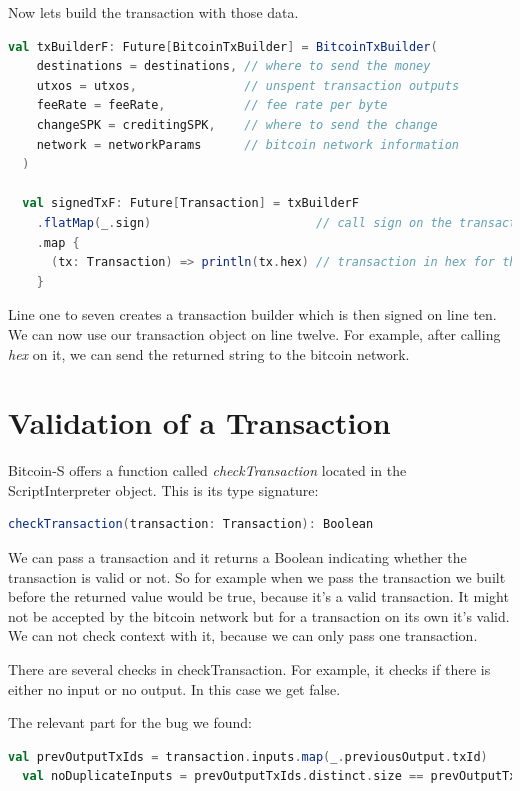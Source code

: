 Now lets build the transaction with those data.
\begin{lstlisting}[language=scala]
  val txBuilderF: Future[BitcoinTxBuilder] = BitcoinTxBuilder(
    destinations = destinations, // where to send the money
    utxos = utxos,               // unspent transaction outputs
    feeRate = feeRate,           // fee rate per byte
    changeSPK = creditingSPK,    // where to send the change
    network = networkParams      // bitcoin network information
  )

  val signedTxF: Future[Transaction] = txBuilderF
    .flatMap(_.sign)                       // call sign on the transaction builder
    .map {
      (tx: Transaction) => println(tx.hex) // transaction in hex for the bitcoin network
    }
\end{lstlisting}


Line one to seven creates a transaction builder which is then signed on line ten.
We can now use our transaction object on line twelve.
For example, after calling \emph{hex} on it, we can send the returned string to the bitcoin network.


\section{Validation of a Transaction}

Bitcoin-S offers a function called \emph{checkTransaction} located in the ScriptInterpreter object.
This is its type signature:
\begin{lstlisting}[language=scala]
  checkTransaction(transaction: Transaction): Boolean
\end{lstlisting}


We can pass a transaction and it returns a Boolean indicating whether the transaction is valid or not.
So for example when we pass the transaction we built before the returned value would be true, because it's a valid transaction.
It might not be accepted by the bitcoin network but for a transaction on its own it's valid.
We can not check context with it, because we can only pass one transaction.

There are several checks in checkTransaction.
For example, it checks if there is either no input or no output.
In this case we get false.

The relevant part for the bug we found:
\begin{lstlisting}[language=scala]
  val prevOutputTxIds = transaction.inputs.map(_.previousOutput.txId)
  val noDuplicateInputs = prevOutputTxIds.distinct.size == prevOutputTxIds.size
\end{lstlisting}

